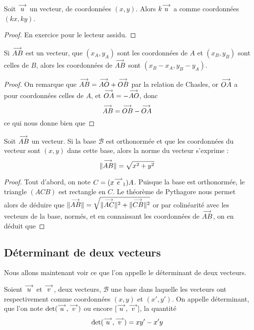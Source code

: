\begin{prop}
    Soit $\overset{\longrightarrow}{u}$ un vecteur, de coordonnées $(x,y)$. Alors $k\overset{\longrightarrow}{u}$ a comme coordonnées $(kx,ky)$.
\end{prop}
\begin{proof}
    En exercice pour le lecteur assidu.
\end{proof}

\begin{prop}
    Si $\overset{\longrightarrow}{AB}$ est un vecteur, que $(x_A,y_A)$ sont les coordonnées de $A$ et $(x_B,y_B)$ sont celles de $B$, alors les coordonnées de $\overset{\longrightarrow}{AB}$ sont $(x_B-x_A,y_B-y_A)$.
\end{prop}
\begin{proof}
    On remarque que $\overset{\longrightarrow}{AB}=\overset{\longrightarrow}{AO}+\overset{\longrightarrow}{OB}$ par la relation de Chasles, or $\overset{\longrightarrow}{OA}$ a pour coordonnées celles de $A$, et $\overset{\longrightarrow}{OA}=-\overset{\longrightarrow}{AO}$, donc $$\overset{\longrightarrow}{AB}=\overset{\longrightarrow}{OB}-\overset{\longrightarrow}{OA}$$ ce qui nous donne bien que 
\end{proof}

\begin{prop}
    Soit $\overset{\longrightarrow}{AB}$ un vecteur. Si la base $\mathcal B$ est orthonormée et que les coordonnées du vecteur sont $(x,y)$ dans cette base, alors la norme du vecteur s'exprime :
    $$\|\overset{\longrightarrow}{AB}\| = \sqrt{x^2+y^2}$$
\end{prop}
\begin{proof}
    Tout d'abord, on note $C=(x \overset{\longrightarrow}{e}_1) A$. Puisque la base est orthonormée, le triangle $(ACB)$ est rectangle en $C$. Le théorème de Pythagore nous permet alors de déduire que $\|\overset{\longrightarrow}{AB}\|=\sqrt{\|\overset{\longrightarrow}{AC}\|^2+\|\overset{\longrightarrow}{CB}\|^2}$ or par colinéarité avec les vecteurs de la base, normés, et en connaissant les coordonnées de $\overset{\longrightarrow}{AB}$, on en déduit que 
\end{proof}

\subsection{Déterminant de deux vecteurs}

Nous allons maintenant voir ce que l'on appelle le déterminant de deux vecteurs.

\begin{defi}
    Soient $\overset{\longrightarrow}{u}$ et $\overset{\longrightarrow}{v}$, deux vecteurs, $\mathcal B$ une base dans laquelle les vecteurs ont respectivement comme coordonnées $(x,y)$ et $(x',y')$. On appelle déterminant, que l'on note $\det(\overset{\longrightarrow}{u},\overset{\longrightarrow}{v})$ ou encore $[\overset{\longrightarrow}{u},\overset{\longrightarrow}{v}]$, la quantité
    $$\det(\overset{\longrightarrow}{u},\overset{\longrightarrow}{v})=xy'-x'y$$
\end{defi}

